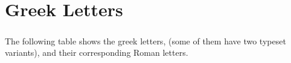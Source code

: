 \appendix


\newcommand{\dd}{d}
\renewcommand{\imath}{i}
\newcommand{\sech}{sech}
\newcommand{\csch}{sech}
\newcommand{\arcsinh}{arcsinh}
\newcommand{\arccosh}{arcosh}
\newcommand{\arctanh}{arctanh}
\renewcommand{\imath}{i}







\chapter{Greek Letters}
\raggedbottom 

\paragraph{}
The following table shows the greek letters, (some of them have two 
typeset variants), and their corresponding Roman letters.

